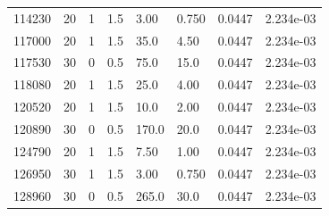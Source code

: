 \documentclass[preview]{standalone}
\begin{document}
{{{\begin{tabular}{L{1.2cm}C{1.2cm} C{0.3cm}C{0.5cm} C{1.4cm}C{1.4cm} C{1.4cm}C{1.4cm}}
  114230  &    20  & 1     & 1.5 &  3.00  & 0.750  & 0.0447 &  2.234e-03   \\ 
  117000  &    20  & 1     & 1.5 &  35.0  & 4.50  & 0.0447 &  2.234e-03   \\ 
  117530  &    30  & 0     & 0.5 &  75.0  & 15.0  & 0.0447 &  2.234e-03   \\ 
  118080  &    20  & 1     & 1.5 &  25.0  & 4.00  & 0.0447 &  2.234e-03   \\ 
  120520  &    20  & 1     & 1.5 &  10.0  & 2.00  & 0.0447 &  2.234e-03   \\ 
  120890  &    30  & 0     & 0.5 &  170.0  & 20.0  & 0.0447 &  2.234e-03   \\ 
  124790  &    20  & 1     & 1.5 &  7.50  & 1.00  & 0.0447 &  2.234e-03   \\ 
  126950  &    30  & 1     & 1.5 &  3.00  & 0.750  & 0.0447 &  2.234e-03   \\ 
  128960  &    30  & 0     & 0.5 &  265.0  & 30.0  & 0.0447 &  2.234e-03   \\ 
\hline 
\end{tabular} 

}}}
\end{document}
